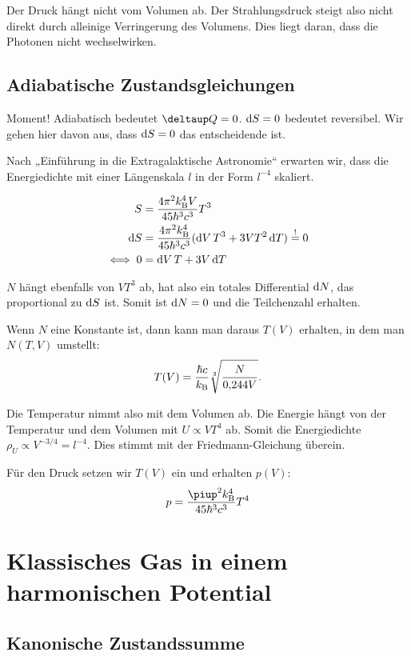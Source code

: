 Der Druck hängt nicht vom Volumen ab. Der Strahlungsdruck steigt also nicht
direkt durch alleinige Verringerung des Volumens. Dies liegt daran, dass die
Photonen nicht wechselwirken.

\subsection{Adiabatische Zustandsgleichungen}

Moment! Adiabatisch bedeutet $\deltaup Q = 0$. $\dif S = 0$ bedeutet
reversibel. Wir gehen hier davon aus, dass $\dif S = 0$ das entscheidende ist.

Nach „Einführung in die Extragalaktische Astronomie“ erwarten wir, dass die
Energiedichte mit einer Längenskala $l$ in der Form $l^{-4}$ skaliert.

\begin{align*}
    S &= \frac{4 \pi^2 \kB^4 V}{45 \hbar^3 c^3} T^3 \\
    \dif S &= \frac{4 \pi^2 \kB^4}{45 \hbar^3 c^3} (\dif V \, T^3 + 3 V T^2 \dif
    T) \overset != 0 \\
    \iff 0 &= \dif V \, T + 3 V \dif T
\end{align*}

$N$ hängt ebenfalls von $V T^3$ ab, hat also ein totales Differential $\dif N$,
das proportional zu $\dif S$ ist. Somit ist $\dif N = 0$ und die Teilchenzahl
erhalten.

Wenn $N$ eine Konstante ist, dann kann man daraus $T(V)$ erhalten, in dem man
$N(T, V)$ umstellt:
\[
    T(V) = \frac{\hbar c}{k_\text B} \sqrt[3]{\frac{N}{\num{0.244} V}}.
\]

Die Temperatur nimmt also mit dem Volumen ab. Die Energie hängt von der
Temperatur und dem Volumen mit $U \propto V T^4$ ab. Somit die Energiedichte
$\rho_U \propto V^{-3/4} = l^{-4}$. Dies stimmt mit der Friedmann-Gleichung
überein.

Für
den Druck setzen wir $T(V)$ ein und erhalten $p(V)$:
\[
    p = \frac{\piup^2 \kB^4}{45 \hbar^3 c^3} T^4
\]

\section{Klassisches Gas in einem harmonischen Potential}

\subsection{Kanonische Zustandssumme}

